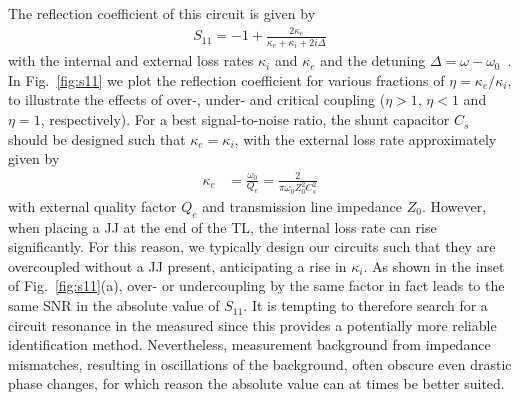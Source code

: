 The reflection coefficient of this circuit is given by
%
\begin{align}
S_{11}=-1+\frac{2\kappa_e}{\kappa_e+\kappa_i+2i\Delta}
\label{eq:intro-s11}
\end{align}
%
with the internal and external loss rates $\kappa_i$ and $\kappa_e$ and the detuning $\Delta=\omega-\omega_0$~\cite{bosmanBroadbandArchitectureGalvanically2015c}.
%
In Fig.~\ref{fig:s11} we plot the reflection coefficient for various fractions of $\eta =\kappa_e/\kappa_i$, to illustrate the effects of over-, under- and critical coupling ($\eta >1$, $\eta <1$ and $\eta =1$, respectively).
%
For a best signal-to-noise ratio, the shunt capacitor $C_s$ should be designed such that $\kappa_e=\kappa_i$, with the external loss rate approximately given by
%
\begin{align}
\kappa_e &= \frac{\omega_0}{Q_e} = \frac{2}{\pi\omega_0Z_0^2C_s^2}
\label{eq:intro-kappae}
\end{align}
%
with external quality factor $Q_e$ and transmission line impedance $Z_0$.
%
However, when placing a JJ at the end of the TL, the internal loss rate can rise significantly.
%
For this reason, we typically design our circuits such that they are overcoupled without a JJ present, anticipating a rise in $\kappa_i$.
%
As shown in the inset of Fig.~\ref{fig:s11}(a), over- or undercoupling by the same factor in fact leads to the same SNR in the absolute value of $S_{11}$.
%
It is tempting to therefore search for a circuit resonance in the measured since this provides a potentially more reliable identification method.
%
Nevertheless, measurement background from impedance mismatches, resulting in oscillations of the background, often obscure even drastic phase changes, for which reason the absolute value can at times be better suited.

